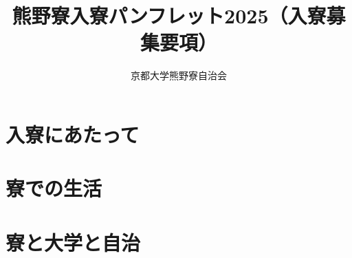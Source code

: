 \documentclass[10pt,a4j,dvipdfmx,openany,uplatex]{jsbook}
\title{熊野寮入寮パンフレット2025（入寮募集要項）}
\author{京都大学熊野寮自治会}
\date{}
\begin{document}


 
\chapter{入寮にあたって}


  

  \vspace{10mm}

  

  \newpage
  



\chapter{寮での生活}

  

  \newpage

  

  \newpage

  

  \newpage
  
  
  
  \newpage
  
  
  

\chapter{寮と大学と自治}
  
  
\end{document}
